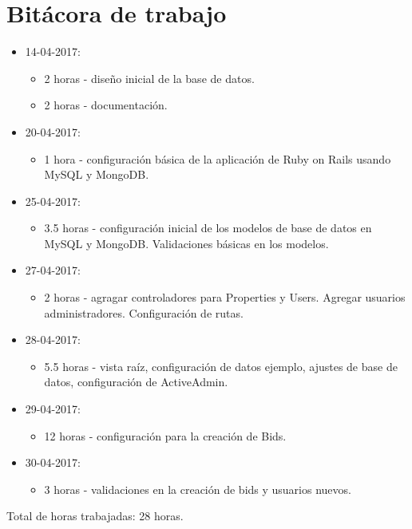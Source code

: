 \documentclass{article}
\begin{document}
\section{Bit\'acora de trabajo}
\begin{itemize}
  \item 14-04-2017:
  \begin{itemize}
    \item 2 horas - dise\~no inicial de la base de datos.
    \item 2 horas - documentaci\'on.
  \end{itemize}
  \item 20-04-2017:
  \begin{itemize}
    \item 1 hora - configuraci\'on b\'asica de la aplicaci\'on de Ruby on Rails usando MySQL y MongoDB.
  \end{itemize}
  \item 25-04-2017:
  \begin{itemize}
    \item 3.5 horas - configuraci\'on inicial de los modelos de base de datos en MySQL y MongoDB. Validaciones b\'asicas en los modelos.
  \end{itemize}
  \item 27-04-2017:
  \begin{itemize}
    \item 2 horas - agragar controladores para Properties y Users. Agregar usuarios administradores. Configuraci\'on de rutas.
  \end{itemize}
  \item 28-04-2017:
  \begin{itemize}
    \item 5.5 horas - vista ra\'iz, configuraci\'on de datos ejemplo, ajustes de base de datos, configuraci\'on de ActiveAdmin.
  \end{itemize}
  \item 29-04-2017:
  \begin{itemize}
    \item 12 horas - configuraci\'on para la creaci\'on de Bids.
  \end{itemize}
  \item 30-04-2017:
  \begin{itemize}
    \item 3 horas - validaciones en la creaci\'on de bids y usuarios nuevos.
  \end{itemize}
\end{itemize}
Total de horas trabajadas: 28 horas.
\end{document}
